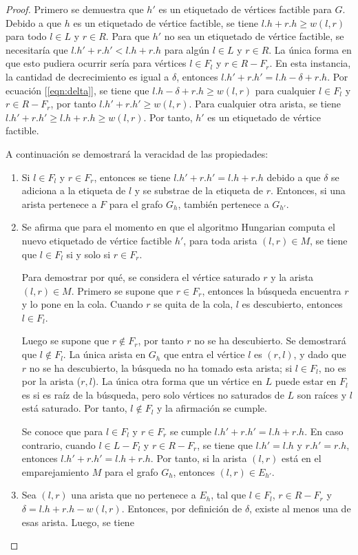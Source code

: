 \documentclass[10pt]{article} %
\begin{document}
\begin{proof}
	Primero se demuestra que $h'$ es un etiquetado de v\'ertices factible para $G$. Debido a que $h$ es un etiquetado de v\'ertice factible, se tiene $l.h + r.h \geq w(l,r)$ para todo $l \in L$ y $r \in R$. Para que $h'$ no sea un etiquetado de v\'ertice factible, se necesitar\'ia que $l.h' + r.h' < l.h + r.h$ para alg\'un $l \in L$ y $r \in R$. La \'unica forma en que esto pudiera ocurrir ser\'ia para v\'ertices $l \in F_l$ y $r \in R-F_r$. En esta instancia, la cantidad de decrecimiento es igual a $\delta$, entonces $l.h' + r.h' = l.h - \delta + r.h$. Por ecuaci\'on [\ref{eqn:delta}], se tiene que $l.h - \delta + r.h \geq w(l,r)$ para cualquier $l \in F_l$ y $r \in R - F_r$, por tanto $l.h' + r.h' \geq w(l,r)$. Para cualquier otra arista, se tiene $l.h' + r.h' \geq l.h + r.h \geq w(l,r)$. Por tanto, $h'$ es un etiquetado de v\'ertice factible.
	
	A continuaci\'on se demostrar\'a la veracidad de las propiedades:
	
	\begin{enumerate}
		\item Si $l \in F_l$ y $r \in F_r$, entonces se tiene $l.h' + r.h' = l.h + r.h$ debido a que $\delta$ se adiciona a la etiqueta de $l$ y se substrae de la etiqueta de $r$. Entonces, si una arista pertenece a $F$ para el grafo $G_h$, tambi\'en pertenece a $G_{h'}$.
		\item Se afirma que para el momento en que el algoritmo Hungarian computa el nuevo etiquetado de v\'ertice factible $h'$, para toda arista $(l,r) \in M$, se tiene que $l \in F_l$ si y solo si $r \in F_r$. 
		
		Para demostrar por qu\'e, se considera el v\'ertice saturado $r$ y la arista $(l,r) \in M$. Primero se supone que $r \in F_r$, entonces la b\'usqueda encuentra $r$ y lo pone en la cola. Cuando $r$ se quita de la cola, $l$ es descubierto, entonces $l \in F_l$. 
		
		Luego se supone que $r \notin F_r$, por tanto $r$ no se ha descubierto. Se demostrar\'a que $l \notin F_l$. La \'unica arista en $G_h$ que entra el v\'ertice $l$ es $(r,l)$, y dado que $r$ no se ha descubierto, la b\'usqueda no ha tomado esta arista; si $l \in F_l$, no es por la arista ($r,l$). La \'unica otra forma que un v\'ertice en $L$ puede estar en $F_l$ es si es ra\'iz de la b\'usqueda, pero solo v\'ertices no saturados de $L$ son ra\'ices y $l$ est\'a saturado. Por tanto, $l \notin F_l$ y la afirmaci\'on se cumple.
		
		Se conoce que para $l \in F_l$ y $r \in F_r$ se cumple $l.h' + r.h' = l.h + r.h$. En caso contrario, cuando $l \in L-F_l$ y $r \in R-F_r$, se tiene que $l.h' = l.h$ y $r.h'=r.h$, entonces $l.h' + r.h' = l.h + r.h$. Por tanto, si la arista $(l,r)$ est\'a en el emparejamiento $M$ para el grafo $G_h$, entonces $(l,r) \in E_{h'}$.
		\item Sea $(l,r)$ una arista que no pertenece a $E_h$, tal que $l \in F_l$, $r \in R-F_r$ y $\delta = l.h + r.h - w(l,r)$. Entonces, por definici\'on de $\delta$, existe al menos una de esas arista. Luego, se tiene 
		

\end{enumerate}
\end{proof}
\end{document}
